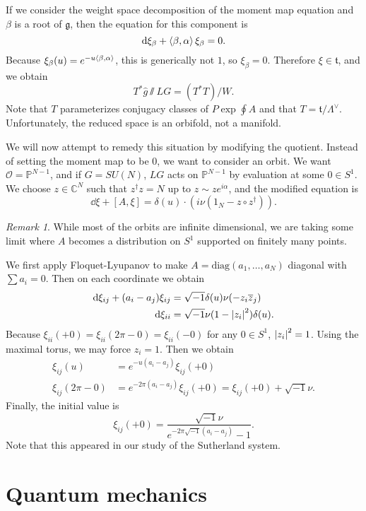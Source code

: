 \documentclass[leqno, openany]{memoir}
\theoremstyle{definition}
\theoremstyle{remark}
\newtheorem{rmk}[thm]{Remark}
\theoremstyle{plain}
\theoremstyle{definition}
\theoremstyle{remark}
\newcommand{\C}{\mathbb{C}}
\renewcommand{\P}{\mathbb{P}}
\newcommand{\g}{\mathfrak{g}}
\newcommand{\mc}[1]{\mathcal{#1}}
\newcommand{\mf}[1]{\mathfrak{#1}}
\newcommand{\mr}[1]{\mathrm{#1}}
\newcommand{\ol}[1]{\overline{#1}}
\newcommand{\wh}[1]{\widehat{#1}}
\begin{document}
If we consider the weight space decomposition of the moment map equation and $\beta$ is a root of $\g$, then the equation for this component is
\[ \dd{\xi_{\beta}} + \ev{\beta, \alpha} \xi_{\beta} = 0. \]
Because $\xi_{\beta}(u) = e^{-u\ev{\beta, \alpha}}$, this is generically not $1$, so $\xi_{\beta} = 0$. Therefore $\xi \in \mf{t}$, and we obtain
\[ T^* \wh{g} \sslash LG = (T^* T)/W. \]
Note that $T$ parameterizes conjugacy classes of $P \exp \oint A$ and that $T = \mf{t}/\Lambda^{\vee}$. Unfortunately, the reduced space is an orbifold, not a manifold.

We will now attempt to remedy this situation by modifying the quotient. Instead of setting the moment map to be $0$, we want to consider an orbit. We want $\mc{O} = \P^{N-1}$, and if $G = SU(N)$, $LG$ acts on $\P^{N-1}$ by evaluation at some $0 \in S^1$. We choose $z \in \C^N$ such that $z^{\dag} z = N$ up to $z \sim ze^{i\alpha}$, and the modified equation is
\[ \dd{\xi} + [A, \xi] = \delta(u) \cdot (i \nu(1_N - z \circ z^{\dag})). \]

\begin{rmk}
While most of the orbits are infinite dimensional, we are taking some limit where $A$ becomes a distribution on $S^1$ supported on finitely many points.
\end{rmk}

We first apply Floquet-Lyupanov to make $A = \mr{diag}(a_1, \ldots, a_N)$ diagonal with $\sum a_i = 0$. Then on each coordinate we obtain
\begin{align*}
  \dd{\xi_{ij}} + (a_i-a_j) \xi_{ij} &= \sqrt{-1} \delta(u)\nu(-z_i \ol{z}_j) \\
  \dd{\xi_{ii}} &= \sqrt{-1} \nu(1-\abs{z_i}^2) \delta(u).
\end{align*}
Because $\xi_{ii}(+0) = \xi_{ii}(2\pi-0) = \xi_{ii}(-0)$ for any $0 \in S^1$, $\abs{z_i}^2 = 1$. Using the maximal torus, we may force $z_i = 1$. Then we obtain
\begin{align*}
  \xi_{ij}(u) &= e^{-u(a_i-a_j)}\xi_{ij}(+0) \\
  \xi_{ij}(2\pi-0) &= e^{-2\pi(a_i-a_j)}\xi_{ij}(+0) = \xi_{ij}(+0) + \sqrt{-1} \nu.
\end{align*}
Finally, the initial value is
\[ \xi_{ij}(+0) = \frac{\sqrt{-1}\nu}{e^{-2\pi \sqrt{-1}(a_i-a_j)}-1}. \]
Note that this appeared in our study of the Sutherland system.

\chapter{Quantum mechanics}
\label{cha:complexified}
\end{document}
